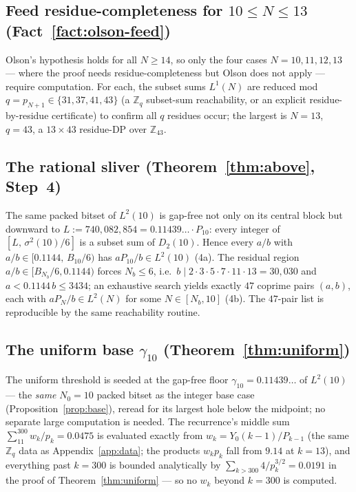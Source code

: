 \documentclass[11pt]{amsart}
\theoremstyle{plain}
\theoremstyle{definition}
\newcommand{\Z}{\mathbb{Z}}
\begin{document}
\subsection*{Feed residue-completeness for \texorpdfstring{$10\le N\le 13$}{10<=N<=13}
(Fact~\ref{fact:olson-feed})}
Olson's hypothesis holds for all $N\ge 14$, so only the four cases
$N=10,11,12,13$ --- where the proof needs residue-completeness but Olson does not
apply --- require computation.  For each, the subset sums $L^1(N)$ are reduced mod
$q=p_{N+1}\in\{31,37,41,43\}$ (a $\Z_q$ subset-sum reachability, or an explicit
residue-by-residue certificate) to confirm all $q$ residues occur; the largest is
$N=13$, $q=43$, a $13\times 43$ residue-DP over $\Z_{43}$.

\subsection*{The rational sliver (Theorem~\ref{thm:above}, Step~4)}
The same packed bitset of $L^2(10)$ is gap-free not only on its central block but
downward to $L:=740{,}082{,}854=0.11439\ldots\cdot P_{10}$: every integer of
$[L,\,\sigma^2(10)/6]$ is a subset sum of $D_2(10)$.  Hence every $a/b$ with
$a/b\in[0.1144,\,B_{10}/6)$ has $aP_{10}/b\in L^2(10)$ (4a).  The residual region
$a/b\in[B_{N_b}/6,0.1144)$ forces $N_b\le 6$, i.e.\ $b\mid 2\cdot3\cdot5\cdot7\cdot
11\cdot13=30{,}030$ and $a<0.1144\,b\le 3434$; an exhaustive search yields exactly
$47$ coprime pairs $(a,b)$, each with $aP_N/b\in L^2(N)$ for some $N\in[N_b,10]$
(4b).  The $47$-pair list is reproducible by the same reachability routine.

\subsection*{The uniform base \texorpdfstring{$\gamma_{10}$}{gamma10}
(Theorem~\ref{thm:uniform})}
The uniform threshold is seeded at the gap-free floor $\gamma_{10}=0.11439\ldots$ of
$L^2(10)$ --- the \emph{same} $N_0=10$ packed bitset as the integer base case
(Proposition~\ref{prop:base}), reread for its largest hole below the midpoint; no
separate large computation is needed.  The recurrence's middle sum
$\sum_{11}^{300}w_k/p_k=0.0475$ is evaluated exactly from $w_k=Y_0(k-1)/P_{k-1}$
(the same $\Z_q$ data as Appendix~\ref{app:data}; the products $w_kp_k$ fall from
$9.14$ at $k=13$), and everything past $k=300$ is bounded analytically by
$\sum_{k>300}4/p_k^{3/2}=0.0191$ in the proof of Theorem~\ref{thm:uniform} --- so no
$w_k$ beyond $k=300$ is computed.
\end{document}
